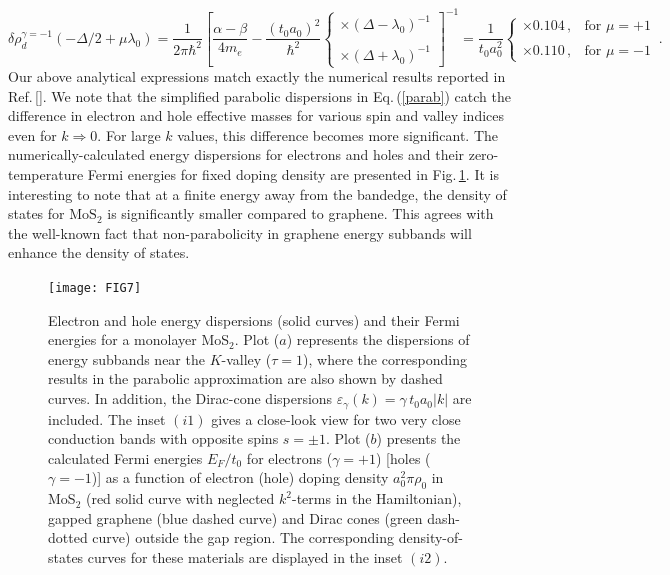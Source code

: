 \documentclass[aps,prb,showpacs]{revtex4}
\begin{document}
\begin{equation}
\delta\rho^{\gamma=-1}_d(-\Delta/2+\mu\lambda_0) = 
\frac{1}{2\pi\hbar^2}\left[\frac{\alpha-\beta}{4m_e}-\frac{(t_0a_0)^2}{\hbar^2}\left\{
\begin{array}{ll}
\times (\Delta-\lambda_0)^{-1}\\
\\
\times (\Delta+\lambda_0)^{-1}
\end{array}\right.\right]^{-1}
=\frac{1}{t_0a_0^2}\left\{\begin{array}{ll}
\times 0.104\, , &  \mbox{for $\mu=+1$}\\
\\
\times 0.110\, , &  \mbox{for $\mu=-1$}
\end{array}\right.\, .
\end{equation}
Our above analytical expressions match exactly
the numerical results reported in Ref.\,[]. We note that the simplified parabolic dispersions in Eq.\,(\ref{parab}) catch 
the difference in electron and hole effective masses for various spin and valley indices even for $k 
\Longrightarrow 0$. For large $k$ values, this difference becomes more significant. The numerically-calculated energy dispersions for electrons and holes and their zero-temperature Fermi energies for 
fixed doping density are presented in Fig.\,\ref{FIG:7}. It is interesting to note that at a finite energy away from the bandedge, the density of states 
for $\mathrm{MoS}_2$ is significantly smaller compared to graphene. This agrees with the well-known fact that non-parabolicity
in graphene energy subbands will enhance the density of states. 
\medskip

\begin{figure}
\centering
\texttt{[image: FIG7]}
\caption{Electron and hole energy dispersions (solid curves) and their Fermi energies for a monolayer MoS$_2$. Plot ($a$) represents the dispersions of energy subbands near
the $K$-valley ($\tau = 1$), where the corresponding results in the parabolic approximation are also shown by dashed curves. In addition, the Dirac-cone dispersions $\varepsilon_\gamma(k) = \gamma\,t_0 a_0 \vert k \vert$ 
are included. The inset $(i1)$ gives a close-look view for two very close conduction bands with opposite spins $s=\pm 1$. 
Plot ($b$) presents the calculated Fermi energies $E_F/t_0$ for electrons ($\gamma=+1$) [holes ($\gamma=-1$)] 
as a function of electron (hole) doping density $a_0^2\pi\rho_0$ in MoS$_2$ (red solid curve with neglected $k^2$-terms in the Hamiltonian), gapped graphene (blue dashed curve) 
and Dirac cones (green dash-dotted curve) outside the gap region. 
The corresponding density-of-states curves for these materials are displayed in the inset $(i2)$.}
\label{FIG:7}
\end{figure}
\end{document}

